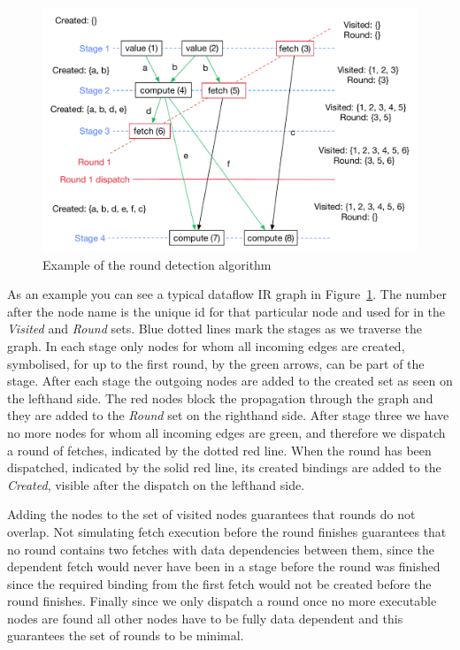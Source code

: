\begin{figure}
    \includegraphics[width=\linewidth]{../Figures/yauhau-round-detection}
    \caption{Example of the round detection algorithm}
    \label{fig:yauhau-round-detection}
\end{figure}

As an example you can see a typical dataflow IR graph in Figure~\ref{fig:yauhau-round-detection}.
The number after the node name is the unique id for that particular node and used for in the \emph{Visited} and \emph{Round} sets.
Blue dotted lines mark the stages as we traverse the graph.
In each stage only nodes for whom all incoming edges are created, symbolised, for up to the first round, by the green arrows, can be part of the stage.
After each stage the outgoing nodes are added to the created set as seen on the lefthand side.
The red \fetch{} nodes block the propagation through the graph and they are added to the \emph{Round} set on the righthand side.
After stage three we have no more nodes for whom all incoming edges are green, and therefore we dispatch a round of fetches, indicated by the dotted red line.
When the round has been dispatched, indicated by the solid red line, its created bindings are added to the \emph{Created}, visible after the dispatch on the lefthand side.

Adding the \fetch{} nodes to the set of visited nodes guarantees that rounds do not overlap.
Not simulating fetch execution before the round finishes guarantees that no round contains two fetches with data dependencies between them, since the dependent fetch would never have been in a stage before the round was finished since the required binding from the first fetch would not be created before the round finishes.
Finally since we only dispatch a round once no more executable nodes are found all other nodes have to be fully data dependent and this guarantees the set of rounds to be minimal.

